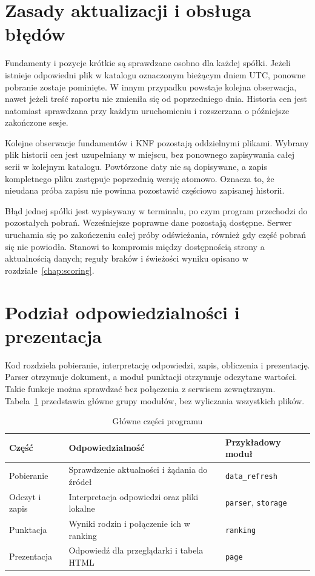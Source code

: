 \documentclass[12pt,a4paper,twoside]{report}
\begin{document}
\section{Zasady aktualizacji i obsługa błędów}

Fundamenty i pozycje krótkie są sprawdzane osobno dla każdej spółki. Jeżeli istnieje odpowiedni plik w katalogu oznaczonym bieżącym dniem UTC, ponowne pobranie zostaje pominięte. W innym przypadku powstaje kolejna obserwacja, nawet jeżeli treść raportu nie zmieniła się od poprzedniego dnia. Historia cen jest natomiast sprawdzana przy każdym uruchomieniu i rozszerzana o późniejsze zakończone sesje.

Kolejne obserwacje fundamentów i KNF pozostają oddzielnymi plikami. Wybrany plik historii cen jest uzupełniany w miejscu, bez ponownego zapisywania całej serii w kolejnym katalogu. Powtórzone daty nie są dopisywane, a zapis kompletnego pliku zastępuje poprzednią wersję atomowo. Oznacza to, że nieudana próba zapisu nie powinna pozostawić częściowo zapisanej historii.

Błąd jednej spółki jest wypisywany w terminalu, po czym program przechodzi do pozostałych pobrań. Wcześniejsze poprawne dane pozostają dostępne. Serwer uruchamia się po zakończeniu całej próby odświeżania, również gdy część pobrań się nie powiodła. Stanowi to kompromis między dostępnością strony a aktualnością danych; reguły braków i świeżości wyniku opisano w rozdziale~\ref{chap:scoring}.

\section{Podział odpowiedzialności i prezentacja}

Kod rozdziela pobieranie, interpretację odpowiedzi, zapis, obliczenia i prezentację. Parser otrzymuje dokument, a moduł punktacji otrzymuje odczytane wartości. Takie funkcje można sprawdzać bez połączenia z serwisem zewnętrznym. Tabela~\ref{tab:modules} przedstawia główne grupy modułów, bez wyliczania wszystkich plików.

\begin{table}[htbp]
\centering
\caption{Główne części programu}
\label{tab:modules}
\small
\begin{tabularx}{\textwidth}{p{3cm}XX}
\toprule
Część & Odpowiedzialność & Przykładowy moduł \\
\midrule
Pobieranie & Sprawdzenie aktualności i żądania do źródeł & \texttt{data\_refresh} \\
Odczyt i zapis & Interpretacja odpowiedzi oraz pliki lokalne & \texttt{parser}, \texttt{storage} \\
Punktacja & Wyniki rodzin i połączenie ich w ranking & \texttt{ranking} \\
Prezentacja & Odpowiedź dla przeglądarki i tabela HTML & \texttt{page} \\
\bottomrule
\end{tabularx}
\end{table}
\end{document}
